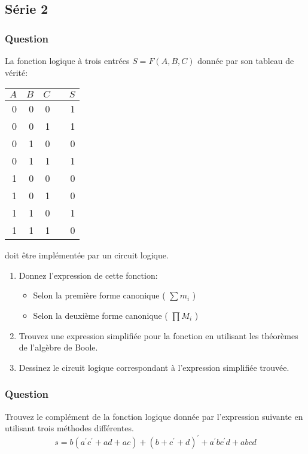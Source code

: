 \documentclass[11pt]{article}
\begin{document}
\subsection*{Série 2}
\label{sec:orgeedde50}
\subsubsection*{Question}
\label{sec:orga8b1040}
La fonction logique à trois entrées \(S = F(A,B,C)\) donnée par son 
   tableau de vérité:
\begin{center}
\begin{tabular}{rrrlr}
\(A\) & \(B\) & \(C\) &  & \(S\)\\[0pt]
\hline
0 & 0 & 0 &  & 1\\[0pt]
0 & 0 & 1 &  & 1\\[0pt]
0 & 1 & 0 &  & 0\\[0pt]
0 & 1 & 1 &  & 1\\[0pt]
1 & 0 & 0 &  & 0\\[0pt]
1 & 0 & 1 &  & 0\\[0pt]
1 & 1 & 0 &  & 1\\[0pt]
1 & 1 & 1 &  & 0\\[0pt]
\end{tabular}
\end{center}

doit être implémentée par un circuit logique.

\begin{enumerate}
\item Donnez l'expression de cette fonction:

\begin{itemize}
\item Selon la première forme canonique ( \(\sum m_i\) )

\item Selon la deuxième forme canonique ( \(\prod M_i\) )
\end{itemize}

\item Trouvez une expression simplifiée pour la fonction en utilisant
les théorèmes de l'algèbre de Boole.

\item Dessinez le circuit logique correspondant à l'expression
simplifiée trouvée.
\end{enumerate}

\subsubsection*{Question}
\label{sec:orgdd65568}
Trouvez le complément de la fonction logique donnée par l'expression
   suivante en utilisant trois méthodes différentes.
   $$
    s = b (a^{\prime} c^{\prime} + a d + a c) + (b + c^{\prime}+
      d)^{\prime} + a^{\prime} b c^{\prime} d + a b c d
    $$
\end{document}
